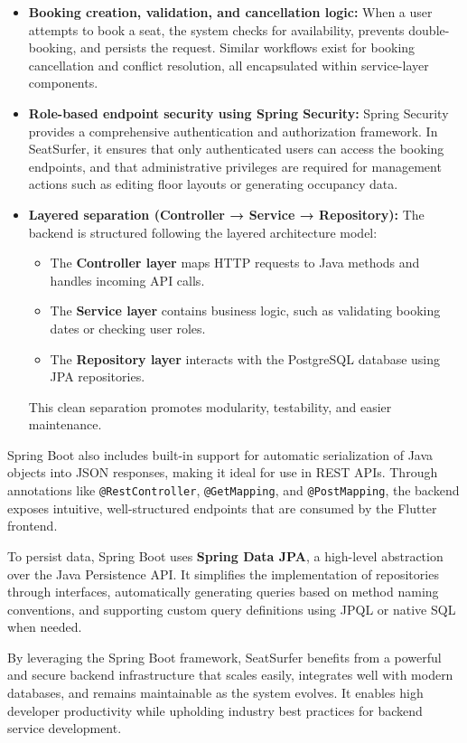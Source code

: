 \documentclass[12pt,a4paper]{report} %
\begin{document}
\begin{itemize}
\item \textbf{Booking creation, validation, and cancellation logic:} When a user attempts to book a seat, the system checks for availability, prevents double-booking, and persists the request. Similar workflows exist for booking cancellation and conflict resolution, all encapsulated within service-layer components.
\item \textbf{Role-based endpoint security using Spring Security:} Spring Security provides a comprehensive authentication and authorization framework. In SeatSurfer, it ensures that only authenticated users can access the booking endpoints, and that administrative privileges are required for management actions such as editing floor layouts or generating occupancy data.
\item \textbf{Layered separation (Controller → Service → Repository):} The backend is structured following the layered architecture model:
\begin{itemize}
    \item The \textbf{Controller layer} maps HTTP requests to Java methods and handles incoming API calls.
    \item The \textbf{Service layer} contains business logic, such as validating booking dates or checking user roles.
    \item The \textbf{Repository layer} interacts with the PostgreSQL database using JPA repositories.
\end{itemize}
This clean separation promotes modularity, testability, and easier maintenance.
\end{itemize}

Spring Boot also includes built-in support for automatic serialization of Java objects into JSON responses, making it ideal for use in REST APIs. Through annotations like \texttt{@RestController}, \texttt{@GetMapping}, and \texttt{@PostMapping}, the backend exposes intuitive, well-structured endpoints that are consumed by the Flutter frontend.

To persist data, Spring Boot uses \textbf{Spring Data JPA}, a high-level abstraction over the Java Persistence API. It simplifies the implementation of repositories through interfaces, automatically generating queries based on method naming conventions, and supporting custom query definitions using JPQL or native SQL when needed.

By leveraging the Spring Boot framework, SeatSurfer benefits from a powerful and secure backend infrastructure that scales easily, integrates well with modern databases, and remains maintainable as the system evolves. It enables high developer productivity while upholding industry best practices for backend service development.
\end{document}
